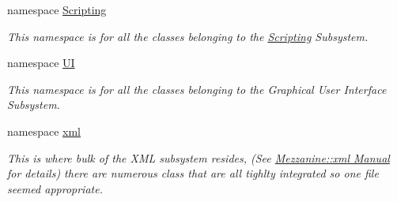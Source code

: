 \begin{DoxyCompactItemize}
\item 
namespace \hyperlink{namespaceMezzanine_1_1Scripting}{Scripting}


\begin{DoxyCompactList}\small\item\em This namespace is for all the classes belonging to the \hyperlink{namespaceMezzanine_1_1Scripting}{Scripting} Subsystem. \item\end{DoxyCompactList}

\item 
namespace \hyperlink{namespaceMezzanine_1_1UI}{UI}


\begin{DoxyCompactList}\small\item\em This namespace is for all the classes belonging to the Graphical User Interface Subsystem. \item\end{DoxyCompactList}

\item 
namespace \hyperlink{namespaceMezzanine_1_1xml}{xml}


\begin{DoxyCompactList}\small\item\em This is where bulk of the XML subsystem resides, (See \hyperlink{XMLManual}{Mezzanine::xml Manual} for details) there are numerous class that are all tighlty integrated so one file seemed appropriate. \item\end{DoxyCompactList}

\end{DoxyCompactItemize}
